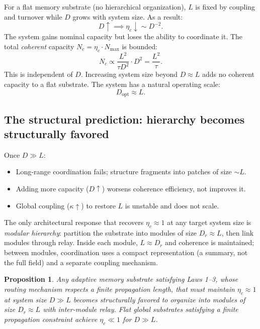 \documentclass[12pt]{article}
\newtheorem{proposition}{Proposition}
\begin{document}
For a flat memory substrate (no hierarchical organization), $L$ is fixed by coupling and turnover while $D$ grows with system size. As a result:
\begin{equation*}
  D \uparrow \implies \eta_c \downarrow \sim D^{-2}.
\end{equation*}
The system gains nominal capacity but loses the ability to coordinate it. The total \emph{coherent} capacity $N_c = \eta_c \cdot N_{\max}$ is bounded:
\begin{equation}
  N_c \propto \frac{L^2}{\tau D^2} \cdot D^2 = \frac{L^2}{\tau}.
\end{equation}
This is independent of $D$. Increasing system size beyond $D \approx L$ adds no coherent capacity to a flat substrate. The system has a natural operating scale:
\begin{equation}
  D_{\text{opt}} \approx L.
  \label{eq:dopt}
\end{equation}

\subsection{The structural prediction: hierarchy becomes structurally favored}

Once $D \gg L$:
\begin{itemize}
  \item Long-range coordination fails; structure fragments into patches of size $\sim L$.
  \item Adding more capacity ($D \uparrow$) worsens coherence efficiency, not improves it.
  \item Global coupling ($\kappa \uparrow$) to restore $L$ is unstable and does not scale.
\end{itemize}

The only architectural response that recovers $\eta_c \approx 1$ at any target system size is \emph{modular hierarchy}: partition the substrate into modules of size $D_r \approx L$, then link modules through relay. Inside each module, $L \approx D_r$ and coherence is maintained; between modules, coordination uses a compact representation (a summary, not the full field) and a separate coupling mechanism.

\begin{proposition}
\label{prop:hierarchy}
Any adaptive memory substrate satisfying Laws 1--3, whose routing mechanism respects a finite propagation length, that must maintain $\eta_c \approx 1$ at system size $D \gg L$ becomes structurally favored to organize into modules of size $D_r \approx L$ with inter-module relay. Flat global substrates satisfying a finite propagation constraint achieve $\eta_c \ll 1$ for $D \gg L$.
\end{proposition}
\end{document}

